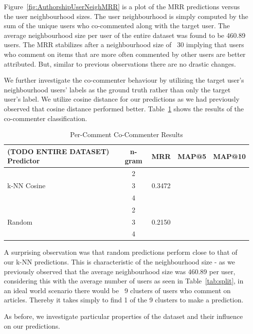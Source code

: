 Figure~\ref{fig:AuthorshipUserNeighMRR} is a plot of the MRR predictions versus the user neighbourhood sizes. The user neighbourhood is simply computed by the sum of the unique users who co-commented along with the target user. The average neighbourhood size per user of the entire dataset was found to be 460.89 users. The MRR stabilizes after a neighbourhood size of ~30 implying that users who comment on items that are more often commented by other users are better attributed. But, similar to previous observations there are no drastic changes.

We further investigate the co-commenter behaviour by utilizing the target user's neighbourhood users' labels as the ground truth rather than only the target user's label. We utilize cosine distance for our predictions as we had previously observed that cosine distance performed better. Table~\ref{tab:co_com_results} shows the results of the co-commenter classification.

\begin{table}[!h]
\centering
\begin{tabular}{|l|c|c|c|c|}
\hline
 \textbf{(TODO ENTIRE DATASET) Predictor} & \textbf{n-gram} & \textbf{MRR} & \textbf{MAP@5} & \textbf{MAP@10}\\ \hline
 \multirow{3}{*}{k-NN Cosine} & 2 & &  & \\ \cline{2-5}
 & 3 & 0.3472 & &  \\ \cline{2-5}
 & 4 & & & \\ \hline
 \multirow{3}{*}{Random} & 2 & &  & \\ \cline{2-5}
 & 3 & 0.2150 & &  \\ \cline{2-5}
 & 4 & & & \\ \hline
\end{tabular}
\caption{Per-Comment Co-Commenter Results}
\label{tab:co_com_results}
\end{table}

A surprising observation was that random predictions perform close to that of our k-NN predictions. This is characteristic of the neighbourhood size - as we previously observed that the average neighbourhood size was 460.89 per user, considering this with the average number of users as seen in Table~\ref{tab:split}, in an ideal world scenario there would be ~9 clusters of users who comment on articles. Thereby it takes simply to find 1 of the 9 clusters to make a prediction.

As before, we investigate particular properties of the dataset and their influence on our predictions.


